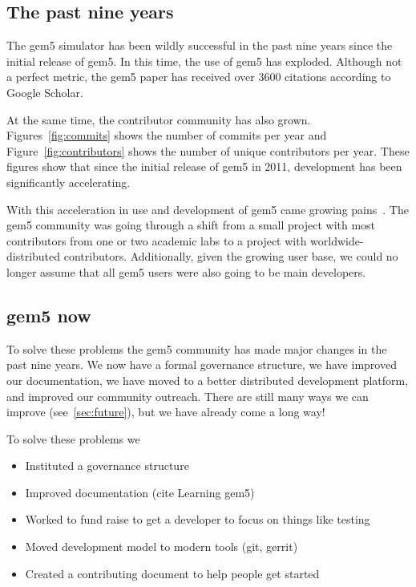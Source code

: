 \subsection{The past nine years}

The gem5 simulator has been wildly successful in the past nine years since the initial release of gem5.
In this time, the use of gem5 has exploded.
Although not a perfect metric, the gem5 paper has received over 3600 citations according to Google Scholar.

At the same time, the contributor community has also grown.
Figures~\ref{fig:commits} shows the number of commits per year and Figure~\ref{fig:contributors} shows the number of unique contributors per year.
These figures show that since the initial release of gem5 in 2011, development has been significantly accelerating.

With this acceleration in use and development of gem5 came growing pains~\cite{Power-gem5horrors-2015}.
The gem5 community was going through a shift from a small project with most contributors from one or two academic labs to a project with worldwide-distributed contributors.
Additionally, given the growing user base, we could no longer assume that all gem5 users were also going to be main developers.

\subsection{gem5 now}
\label{sec:current-gem5}

To solve these problems the gem5 community has made major changes in the past nine years.
We now have a formal governance structure, we have improved our documentation, we have moved to a better distributed development platform, and improved our community outreach.
There are still many ways we can improve (see~\ref{sec:future}), but we have already come a long way!

To solve these problems we
\begin{itemize}
    \item Instituted a governance structure
    \item Improved documentation (cite Learning gem5)
    \item Worked to fund raise to get a developer to focus on things like testing
    \item Moved development model to modern tools (git, gerrit)
    \item Created a contributing document to help people get started
\end{itemize}


